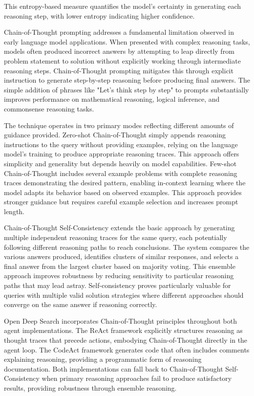 This entropy-based measure quantifies the model's certainty in generating each reasoning step, with lower entropy indicating higher confidence.


Chain-of-Thought prompting addresses a fundamental limitation observed in early language model applications. When presented with complex reasoning tasks, models often produced incorrect answers by attempting to leap directly from problem statement to solution without explicitly working through intermediate reasoning steps. Chain-of-Thought prompting mitigates this through explicit instruction to generate step-by-step reasoning before producing final answers. The simple addition of phrases like "Let's think step by step" to prompts substantially improves performance on mathematical reasoning, logical inference, and commonsense reasoning tasks.

The technique operates in two primary modes reflecting different amounts of guidance provided. Zero-shot Chain-of-Thought simply appends reasoning instructions to the query without providing examples, relying on the language model's training to produce appropriate reasoning traces. This approach offers simplicity and generality but depends heavily on model capabilities. Few-shot Chain-of-Thought includes several example problems with complete reasoning traces demonstrating the desired pattern, enabling in-context learning where the model adapts its behavior based on observed examples. This approach provides stronger guidance but requires careful example selection and increases prompt length.

Chain-of-Thought Self-Consistency extends the basic approach by generating multiple independent reasoning traces for the same query, each potentially following different reasoning paths to reach conclusions. The system compares the various answers produced, identifies clusters of similar responses, and selects a final answer from the largest cluster based on majority voting. This ensemble approach improves robustness by reducing sensitivity to particular reasoning paths that may lead astray. Self-consistency proves particularly valuable for queries with multiple valid solution strategies where different approaches should converge on the same answer if reasoning correctly.

Open Deep Search incorporates Chain-of-Thought principles throughout both agent implementations. The ReAct framework explicitly structures reasoning as thought traces that precede actions, embodying Chain-of-Thought directly in the agent loop. The CodeAct framework generates code that often includes comments explaining reasoning, providing a programmatic form of reasoning documentation. Both implementations can fall back to Chain-of-Thought Self-Consistency when primary reasoning approaches fail to produce satisfactory results, providing robustness through ensemble reasoning.

